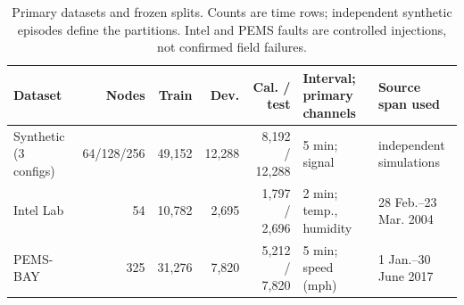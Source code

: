 \begin{table}[t]
\centering\caption{Primary datasets and frozen splits. Counts are time rows; independent synthetic episodes define the partitions. Intel and PEMS faults are controlled injections, not confirmed field failures.}
\label{tab:data}\footnotesize\setlength{\tabcolsep}{4pt}
\begin{tabular}{lrrrrll}
\toprule Dataset & Nodes & Train & Dev. & Cal. / test & Interval; primary channels & Source span used\\\midrule
Synthetic (3 configs) & 64/128/256 & 49,152 & 12,288 & 8,192 / 12,288 & 5 min; signal & independent simulations \\
Intel Lab & 54 & 10,782 & 2,695 & 1,797 / 2,696 & 2 min; temp., humidity & 28 Feb.--23 Mar. 2004 \\
PEMS-BAY & 325 & 31,276 & 7,820 & 5,212 / 7,820 & 5 min; speed (mph) & 1 Jan.--30 June 2017 \\
\bottomrule\end{tabular}
\end{table}
